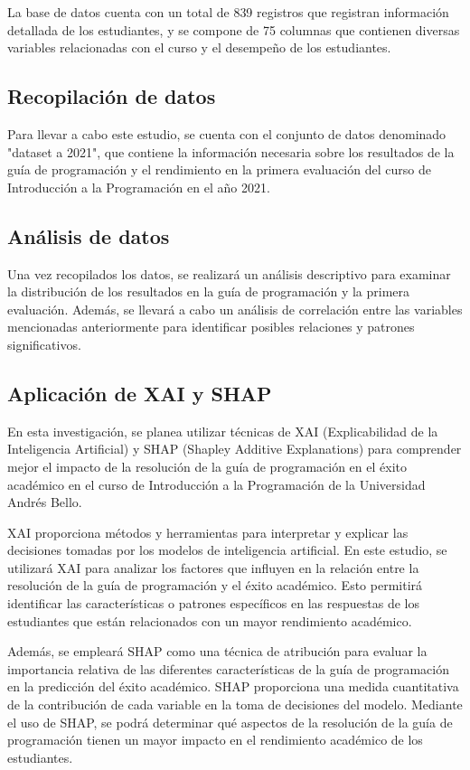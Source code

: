 La base de datos cuenta con un total de 839 registros que registran información detallada de los
estudiantes, y se compone de 75 columnas que contienen diversas variables relacionadas con el curso
y el desempeño de los estudiantes.

\subsection{Recopilación de datos}

Para llevar a cabo este estudio, se cuenta con el conjunto de datos denominado "dataset a 2021", que contiene la información necesaria sobre los
resultados de la guía de programación y el rendimiento en la primera evaluación del curso de Introducción a la Programación en el año 2021.


\subsection{Análisis de datos}

Una vez recopilados los datos, se realizará un análisis descriptivo para examinar la distribución de los resultados en la guía de programación y la primera evaluación. Además, se llevará a cabo un análisis de correlación entre las variables mencionadas anteriormente para identificar posibles
relaciones y patrones significativos.

\subsection{Aplicación de XAI y SHAP}

En esta investigación, se planea utilizar técnicas de XAI (Explicabilidad de la Inteligencia Artificial) y SHAP (Shapley Additive Explanations) para comprender mejor el impacto de la resolución de la guía de programación en el éxito académico en el curso de Introducción a la Programación de la Universidad Andrés Bello.

XAI proporciona métodos y herramientas para interpretar y explicar las decisiones tomadas por los modelos de inteligencia artificial. En este estudio, se utilizará XAI para analizar los factores que influyen en la relación entre la resolución de la guía de programación y el éxito académico. Esto permitirá identificar las características o patrones específicos en las respuestas de los estudiantes que están relacionados con un mayor rendimiento académico.

Además, se empleará SHAP como una técnica de atribución para evaluar la importancia relativa de las diferentes características de la guía de programación en la predicción del éxito académico. SHAP proporciona una medida cuantitativa de la contribución de cada variable en la toma de decisiones del modelo. Mediante el uso de SHAP, se podrá determinar qué aspectos de la resolución de la guía de programación tienen un mayor impacto en el rendimiento académico de los estudiantes.


